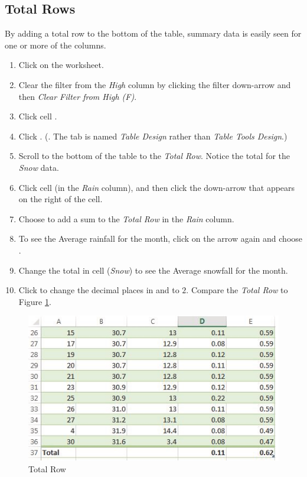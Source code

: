 \subsection{Total Rows}

By adding a total row to the bottom of the table, summary data is easily seen for one or more of the columns. 

\begin{enumbox}
	\begin{enumerate}
		\item Click on the  worksheet.
		\item Clear the filter from the \textit{High} column by clicking the filter down-arrow and then \textit{Clear Filter from High (\textdegree F)}.
		\item Click cell .
		\item Click . (. The tab is named \textit{Table Design} rather than \textit{Table Tools Design}.)
		\item Scroll to the bottom of the table to the \textit{Total Row}. Notice the total for the \textit{Snow} data.
		\item Click cell  (in the \textit{Rain} column), and then click the down-arrow that appears on the right of the cell.
		\item Choose  to add a sum to the \textit{Total Row} in the \textit{Rain} column.
		\item To see the Average rainfall for the month, click on the arrow again and choose .
		\item Change the total in cell  (\textit{Snow}) to see the Average snowfall for the month.
		\item Click  to change the decimal places in  and  to $ 2 $. Compare the \textit{Total Row} to Figure \ref{05:fig22}.
	\end{enumerate}
\end{enumbox}
	
\begin{figure}[H]
	\centering
	\includegraphics[width=\maxwidth{.95\linewidth}]{gfx/ch05_fig22}
	\caption{Total Row}
	\label{05:fig22}
\end{figure}

